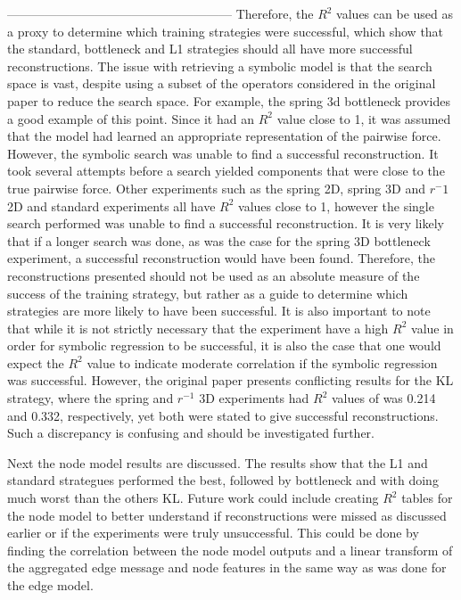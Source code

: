 \documentclass[11pt]{article}
\begin{document}
------------------------------------------------------
Therefore, the $R^2$ values can be used as a proxy to determine which training strategies were successful, which show that the standard, bottleneck and L1 strategies should all have more successful reconstructions. The issue with retrieving a symbolic model is that the search space is vast, despite using a subset of the operators considered in the original paper to reduce the search space. For example, the spring 3d bottleneck provides a good example of this point. Since it had an $R^2$ value close to 1, it was assumed that the model had learned an appropriate representation of the pairwise force. However, the symbolic search was unable to find a successful reconstruction. It took several attempts before a search yielded components that were close to the true pairwise force. Other experiments such as the spring 2D, spring 3D and $r^-1$ 2D and standard experiments all have $R^2$ values close to 1, however the single search performed was unable to find a successful reconstruction. It is very likely that if a longer search was done, as was the case for the spring 3D bottleneck experiment, a successful reconstruction would have been found. Therefore, the reconstructions presented should not be used as an absolute measure of the success of the training strategy, but rather as a guide to determine which strategies are more likely to have been successful. 
It is also important to note that while it is not strictly necessary that the experiment have a high $R^2$ value in order for symbolic regression to be successful, it is also the case that one would expect the $R^2$ value to indicate moderate correlation if the symbolic regression was successful. However, the original paper presents conflicting results for the KL strategy, where the spring and $r^{-1}$ 3D experiments had $R^2$ values of was 0.214 and 0.332, respectively, yet both were stated to give successful reconstructions. Such a discrepancy is confusing and should be investigated further. 

Next the node model results are discussed. The results show that the L1 and standard strategues performed the best, followed by bottleneck and with doing much worst than the others KL. Future work could include creating $R^2$ tables for the node model to better understand if reconstructions were missed as discussed earlier or if the experiments were truly unsuccessful. This could be done by finding the correlation between the node model outputs and a linear transform of the aggregated edge message and node features in the same way as was done for the edge model.
\end{document}
